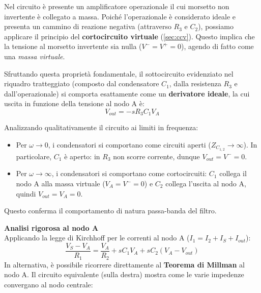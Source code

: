 Nel circuito è presente un amplificatore operazionale il cui morsetto non invertente è collegato a massa. Poiché l'operazionale è considerato ideale e presenta un cammino di reazione negativa (attraverso $R_3$ e $C_2$), possiamo applicare il principio del \textbf{cortocircuito virtuale} (\cref{sec:ccv}). Questo implica che la tensione al morsetto invertente sia nulla ($V^- = V^+ = 0$), agendo di fatto come una \textit{massa virtuale}.

Sfruttando questa proprietà fondamentale, il sottocircuito evidenziato nel riquadro tratteggiato (composto dal condensatore $C_1$, dalla resistenza $R_3$ e dall'operazionale) si comporta esattamente come un \textbf{derivatore ideale}, la cui uscita in funzione della tensione al nodo A è:
\begin{equation}
    V_{out} = -s R_3 C_1 V_A
\end{equation}

Analizzando qualitativamente il circuito ai limiti in frequenza:
\begin{itemize}
    \item Per $\omega \to 0$, i condensatori si comportano come circuiti aperti ($Z_{C_{1,2}} \to \infty$). In particolare, $C_1$ è aperto: in $R_3$ non scorre corrente, dunque $V_{out} = V^- = 0$.
    \item Per $\omega \to \infty$, i condensatori si comportano come cortocircuiti: $C_1$ collega il nodo A alla massa virtuale ($V_A = V^- = 0$) e $C_2$ collega l'uscita al nodo A, quindi $V_{out} = V_A = 0$.
\end{itemize}
Questo conferma il comportamento di natura passa-banda del filtro.

\vspace{0.3cm}
\textbf{Analisi rigorosa al nodo A}\\
Applicando la legge di Kirchhoff per le correnti al nodo A ($I_1 = I_2 + I_S + I_{out}$):
\[
\frac{V_S - V_A}{R_1} = \frac{V_A}{R_2} + sC_1 V_A + sC_2(V_A - V_{out})
\]
In alternativa, è possibile ricorrere direttamente al \textbf{Teorema di Millman} al nodo A. Il circuito equivalente (sulla destra) mostra come le varie impedenze convergano al nodo centrale:

